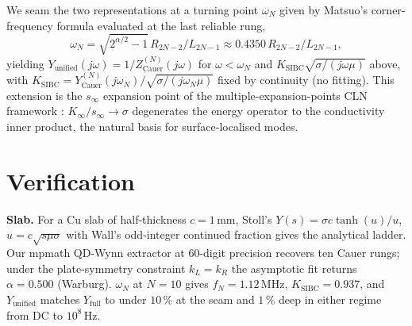 \documentclass[journal,9pt]{igtesymp}
\begin{document}
We seam the two representations at a turning point $\omega_N$ given by Matsuo's corner-frequency formula \cite{Matsuo_2026} evaluated at the last reliable rung,
\begin{equation}
\omega_N \!=\! \sqrt{2^{\alpha/2}\!-\!1}\,R_{2N\!-\!2}/L_{2N\!-\!1} \!\approx\! 0.4350\,R_{2N\!-\!2}/L_{2N\!-\!1}, \label{eq:omegaN}
\end{equation}
yielding $Y_{\text{unified}}(j\omega)\!=\!1/Z_{\text{Cauer}}^{(N)}(j\omega)$ for $\omega\!<\!\omega_N$ and $K_{\text{SIBC}}\sqrt{\sigma/(j\omega\mu)}$ above, with $K_{\text{SIBC}}\!=\!Y_{\text{Cauer}}^{(N)}(j\omega_N)/\sqrt{\sigma/(j\omega_N\mu)}$ fixed by continuity (no fitting).  This extension is the $s_\infty$ expansion point of the multiple-expansion-points CLN framework \cite{Kuriyama_2019}: $K_\infty/s_\infty\!\to\!\sigma$ degenerates the energy operator to the conductivity inner product, the natural basis for surface-localised modes.

\section{Verification}

{\bf Slab.}  For a Cu slab of half-thickness $c\!=\!1$\,mm, Stoll's $Y(s)\!=\!\sigma c\tanh(u)/u$, $u\!=\!c\sqrt{s\mu\sigma}$ \cite{Stoll1974} with Wall's odd-integer continued fraction \cite{Wall1948} gives the analytical ladder.  Our mpmath QD-Wynn extractor at 60-digit precision recovers ten Cauer rungs; under the plate-symmetry constraint $k_L\!=\!k_R$ \cite{Matsuo_2026} the asymptotic fit returns $\alpha\!=\!0.500$ (Warburg).  $\omega_N$ at $N\!=\!10$ gives $f_N\!=\!1.12$\,MHz, $K_{\text{SIBC}}\!=\!0.937$, and $Y_{\text{unified}}$ matches $Y_{\text{full}}$ to under $10\,\%$ at the seam and $1\,\%$ deep in either regime from DC to $10^{8}$\,Hz.
\end{document}
